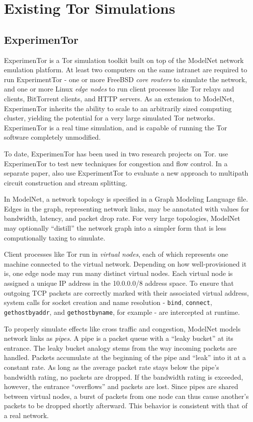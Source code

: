 
\chapter{Existing Tor Simulations}

\section{ExperimenTor}
ExperimenTor \citep{exptorwpaper} is a Tor simulation toolkit built on top of the ModelNet \citep{modelnetwpaper} network emulation platform. At least two computers on the same intranet are required to run ExperimentTor - one or more FreeBSD \emph{core routers} to simulate the network, and one or more Linux \emph{edge nodes} to run client processes like Tor relays and clients, BitTorrent clients, and HTTP servers. As an extension to ModelNet, ExperimenTor inherits the ability to scale to an arbitrarily sized computing cluster, yielding the potential for a very large simulated Tor networks. ExperimenTor is a real time simulation, and is capable of running the Tor software completely unmodified.

To date, ExperimenTor has been used in two research projects on Tor. \citet{defenestrator} use ExperimenTor to test new techniques for congestion and flow control. In a separate paper, \citet{pathlesstraveled} also use ExperimentTor to evaluate a new approach to multipath circuit construction and stream splitting.

In ModelNet, a network topology is specified in a Graph Modeling Language file. Edges in the graph, representing network links, may be annotated with values for bandwidth, latency, and packet drop rate. For very large topologies, ModelNet may optionally ``distill'' the network graph into a simpler form that is less computionally taxing to simulate.

Client processes like Tor run in \emph{virtual nodes}, each of which represents one machine connected to the virtual network. Depending on how well-provisioned it is, one edge node may run many distinct virtual nodes. Each virtual node is assigned a unique IP address in the 10.0.0.0/8 address space. To ensure that outgoing TCP packets are correctly marked with their associated virtual address, system calls for socket creation and name resolution - \texttt{bind}, \texttt{connect}, \texttt{gethostbyaddr}, and \texttt{gethostbyname}, for example - are intercepted at runtime.

To properly simulate effects like cross traffic and congestion, ModelNet models network links as \textit{pipes}. A pipe is a packet queue with a ``leaky bucket'' at its entrance. The leaky bucket analogy stems from the way incoming packets are handled. Packets accumulate at the beginning of the pipe and ``leak'' into it at a constant rate. As long as the average packet rate stays below the pipe's bandwidth rating, no packets are dropped. If the bandwidth rating is exceeded, however, the entrance ``overflows'' and packets are lost. Since pipes are shared between virtual nodes, a burst of packets from one node can thus cause another's packets to be dropped shortly afterward. This behavior is consistent with that of a real network.

